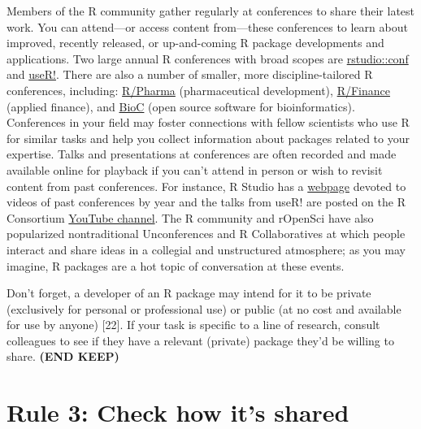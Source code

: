 \documentclass[10pt,letterpaper]{article}
\begin{document}
Members of the R community gather regularly at conferences to share
their latest work. You can attend---or access content from---these
conferences to learn about improved, recently released, or up-and-coming
R package developments and applications. Two large annual R conferences
with broad scopes are
\href{https://rstudio.com/conference/}{rstudio::conf} and
\href{https://www.r-consortium.org/}{useR!}. There are also a number of
smaller, more discipline-tailored R conferences, including:
\href{https://rinpharma.com/}{R/Pharma} (pharmaceutical development),
\href{https://www.rinfinance.com/}{R/Finance} (applied finance), and
\href{https://www.bioconductor.org/help/events/}{BioC} (open source
software for bioinformatics). Conferences in your field may foster
connections with fellow scientists who use R for similar tasks and help
you collect information about packages related to your expertise. Talks
and presentations at conferences are often recorded and made available
online for playback if you can't attend in person or wish to revisit
content from past conferences. For instance, R Studio has a
\href{https://rstudio.com/resources/rstudioconf-2020/}{webpage} devoted
to videos of past conferences by year and the talks from useR! are
posted on the R Consortium
\href{https://www.youtube.com/channel/UC_R5smHVXRYGhZYDJsnXTwg/featured}{YouTube
channel}. The R community and rOpenSci have also popularized
nontraditional Unconferences and R Collaboratives at which people
interact and share ideas in a collegial and unstructured atmosphere; as
you may imagine, R packages are a hot topic of conversation at these
events.

Don't forget, a developer of an R package may intend for it to be
private (exclusively for personal or professional use) or public (at no
cost and available for use by anyone) {[}22{]}. If your task is specific
to a line of research, consult colleagues to see if they have a relevant
(private) package they'd be willing to share. \textbf{(END KEEP)}

\hypertarget{rule-3-check-how-its-shared}{%
\section{Rule 3: Check how it's
shared}\label{rule-3-check-how-its-shared}}
\end{document}
